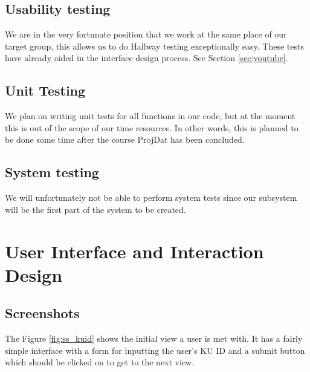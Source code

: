 \documentclass[11pt,a4paper]{report}
\begin{document}
\subsection{Usability testing}
We are in the very fortunate position that we work at the same place of our target group, this allows us to do Hallway testing exceptionally easy. These tests have already aided in the interface design process. See Section \ref{sec:youtube}.%

\subsection{Unit Testing}
We plan on writing unit tests for all functions in our code, but at the moment this is out of the scope of our time resources. In other words, this is planned to be done some time after the course ProjDat has been concluded.

\subsection{System testing}
We will unfortunately not be able to perform system tests since our subsystem will be the first part of the system to be created.

\newpage
\section{User Interface and Interaction Design}\label{sec:UI_interactiondesign}
\subsection{Screenshots}

The Figure \ref{fig:ss_kuid} shows the initial view a user is met with. It has a fairly simple interface with a form for inputting the user's KU ID and a submit button which should be clicked on to get to the next view. \\
\end{document}
